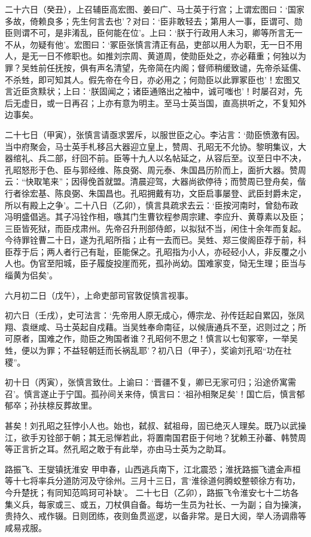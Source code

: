 \documentclass[]{article}
\begin{document}
二十六日（癸丑），上召辅臣高宏图、姜曰广、马士英于行宫；上谓宏图曰：`国家多故，倚赖良多；先生何言去也'？对曰：`臣非敢轻去；第用人一事，臣谓可、勋臣则谓不可，是非淆乱，臣何能在位'。上曰：`朕于行政用人未习，卿等所言无一不从，勿疑有他'。宏图曰：`冢臣张慎言清正有品，吏部以用人为职，无一日不用人，是无一日不修职也。如推刘宗周、黄道周，使勋臣处之，亦必藉重；何独以为罪？吴甡前任抚按，俱有声名清望，先帝简在内阁；督师稍缓致谴，先帝杀延儒、不杀甡，即可知其人。假先帝在今日，亦必用之；何勋臣以此罪冢臣也'！宏图又言近臣贪黩状；上曰：`朕固闻之；诸臣通赂出之袖中，诚可嗤也'！时屡召对，先后无虚日，或一日再召；上亦有意为明主。至马士英当国，直高拱听之，不复知外边事矣。

二十七日（甲寅），张慎言请亟求罢斥，以服世臣之心。李沾言：`勋臣愤激有因。当中府聚会，马士英手札移吕大器迎立皇上，赞周、孔昭无不允协。黎明集议，大器绾礼、兵二部，纡回不前。臣等十九人以名帖延之，从容后至。议至日中不决，孔昭怒形于色、臣与郭经维、陈良弼、周元泰、朱国昌历阶而上，面折大器。赞周云：``快取笔来''；因得俛首就盟。清晨迎驾，大器尚欲停待；而赞周已登舟矣，偕行者徐宏基、陈良弼、朱国昌也。孔昭拥戴有功，文臣启事屡登、武臣封爵未定，所以有殿上之争'。二十八日（乙卯），慎言具疏求去云：`臣按河南时，曾劾布政冯明盛倡逃。其子冯铨作相，嗾其门生曹钦程参周宗建、李应升、黄尊素以及臣；三臣皆死狱，而臣戍肃州。先帝召升刑部侍郎，以拟狱不当，闲住十余年而复起。今待罪铨曹二十日，遂为孔昭所指；止有一去而已。吴甡、郑三俊阁臣荐于前，科臣荐于后；两人者行己有耻，臣能保之。孔昭指为小人，亦硁硁小人，非反覆之小人也。伪官至阳城，臣子履旋投崖而死，孤孙尚幼。国难家变，恸无生理；臣当与缁黄为侣矣'。

六月初二日（戊午），上命吏部司官敦促慎言视事。

初六日（壬戌），史可法言：`先帝用人原无成心，傅宗龙、孙传廷起自累囚，张凤翔、袁继咸、马士英起自戍藉。当吴甡奉命南征，以候唐通兵不至，迟则过之；所可原者，国难之作，勋臣之殉国者谁？孔昭何不思之！慎言以七旬冢宰，一举吴甡，便以为罪；不益轻朝廷而长祸乱耶'？初八日（甲子），奖谕刘孔昭``功在社稷''。

初十日（丙寅），张慎言致仕。上谕曰：`晋疆不复，卿已无家可归；沿途侨寓需召'。慎言遂止于宁国。孤孙间关来侍，慎言曰：`祖孙相聚足矣'！国亡后，慎言郁郁卒；孙扶榇反葬故里。

甚矣！刘孔昭之狂悖小人也。始也，弑叔、弑祖母，固已绝灭人理矣。既乃以武操江，欲手刃铨部于朝；其无忌惮若此，将置南国君臣于何地？犹赖王孙蕃、韩赞周等正言折之耳。然孔昭之敢于有此举，亦由马士英为之助耳。

路振飞、王燮镇抚淮安
甲申春，山西逃兵南下，江北震恐；淮抚路振飞遣金声桓等十七将率兵分道防河及守徐州。三月十三日，言`淮徐道何腾蛟整顿徐方有功，今升楚抚；有同知范鸣珂可补缺'。
二十七日（乙卯），路振飞令淮安七十二坊各集义兵，每家或三、或五，刀杖俱自备。每坊一生员为社长、一为副；自为操演，贵持久、戒作辍。日则团练，夜则鱼贯巡逻，以备非常。是日大阅，举人汤调鼎等咸易戎服。
\end{document}

